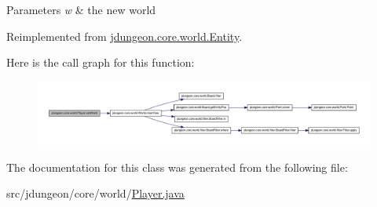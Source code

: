 \begin{DoxyParams}{Parameters}
{\em w} & the new world \\
\hline
\end{DoxyParams}


Reimplemented from \hyperlink{classjdungeon_1_1core_1_1world_1_1_entity_a18211babd569604fb862ee40e6eff9b8}{jdungeon.core.world.Entity}.



Here is the call graph for this function:
\nopagebreak
\begin{figure}[H]
\begin{center}
\leavevmode
\includegraphics[width=400pt]{classjdungeon_1_1core_1_1world_1_1_player_a8928df28dae4b6db028608f6dac561f4_cgraph}
\end{center}
\end{figure}




The documentation for this class was generated from the following file:\begin{DoxyCompactItemize}
\item 
src/jdungeon/core/world/\hyperlink{_player_8java}{Player.java}\end{DoxyCompactItemize}
